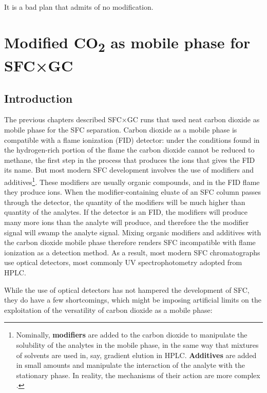 
\begin{savequote}[\quotewidth]
It is a bad plan that admits of no modification.
\end{savequote}

\chapter{Modified CO\textsubscript{2} as mobile phase for SFC×GC} %
\label{Chapter8}

\section{Introduction}

The previous chapters described SFC×GC runs that used neat carbon dioxide as
mobile phase for the SFC separation. Carbon dioxide as a mobile phase is
compatible with a flame ionization (FID) detector: under the conditions found in
the hydrogen-rich portion of the flame the carbon dioxide cannot be reduced to
methane, the first step in the process that produces the ions that gives the FID
its name. But most modern SFC development involves the use of modifiers and
additives\footnote{Nominally, \textbf{modifiers} are added to the carbon dioxide
to manipulate the solubility of the analytes in the mobile phase, in the same
way that mixtures of solvents are used in, say, gradient elution in HPLC.
\textbf{Additives} are added in small amounts and manipulate the interaction of
the analyte with the stationary phase. In reality, the mechanisms of their action
are more complex \autocite{Berger1991}.}. These modifiers are usually organic
compounds, and in the FID flame they produce ions. When the modifier-containing
eluate of an SFC column passes through the detector, the quantity of the
modifiers will be much higher than quantity of the analytes. If the detector is
an FID, the modifiers will produce many more ions than the analyte will produce,
and therefore the the modifier signal will swamp the analyte signal. Mixing
organic modifiers and additives with the carbon dioxide mobile phase therefore
renders SFC incompatible with flame ionization as a detection method. As a
result, most modern SFC chromatographs use optical detectors, most commonly UV
spectrophotometry adopted from HPLC.

While the use of optical detectors has not hampered the development of SFC,
they do have a few shortcomings, which might be imposing artificial limits on
the exploitation of the versatility of carbon dioxide as a mobile phase:

